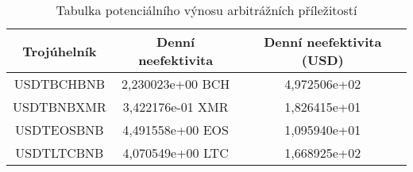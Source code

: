 \begin{table}\centering
\caption{Tabulka potenciálního výnosu arbitrážních příležitostí}
\label{table_gains}
\begin{tabular}{|| c | c | c ||}\hline Trojúhelník & Denní neefektivita & Denní neefektivita (USD)\\ [0.5ex]
 \hline\hline USDTBCHBNB & 2,230023e+00 BCH & 4,972506e+02\\ 
 \hline USDTBNBXMR & 3,422176e-01 XMR & 1,826415e+01\\ 
 \hline USDTEOSBNB & 4,491558e+00 EOS & 1,095940e+01\\ 
 \hline USDTLTCBNB & 4,070549e+00 LTC & 1,668925e+02\\ 
 \hline
\end{tabular}
\end{table}